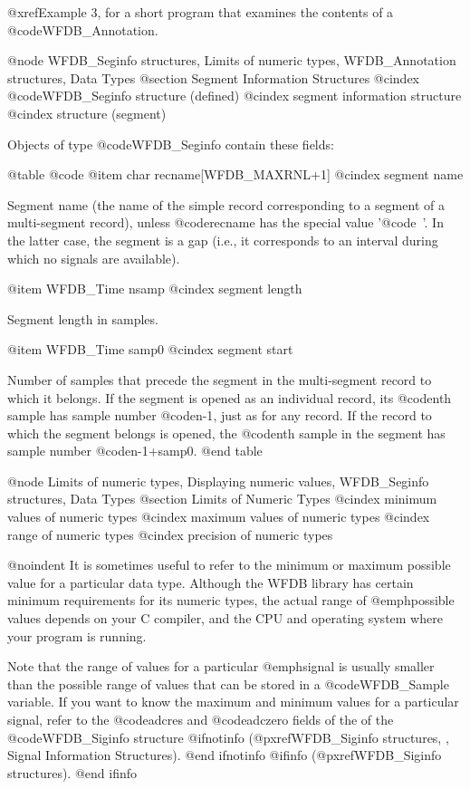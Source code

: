{{{{{{{{{@xref{Example 3}, for a short program that examines the contents of a
@code{WFDB_Annotation}.

@node WFDB_Seginfo structures, Limits of numeric types, WFDB_Annotation structures, Data Types
@section Segment Information Structures
@cindex @code{WFDB_Seginfo} structure (defined)
@cindex segment information structure
@cindex structure (segment)

Objects of type @code{WFDB_Seginfo} contain these fields:

@table @code
@item char recname[WFDB_MAXRNL+1]
@cindex segment name

Segment name (the name of the simple record corresponding
to a segment of a multi-segment record), unless @code{recname}
has the special value '@code{~}'.  In the latter case, the
segment is a gap (i.e., it corresponds to an interval during
which no signals are available).

@item WFDB_Time nsamp
@cindex segment length

Segment length in samples.

@item WFDB_Time samp0
@cindex segment start

Number of samples that precede the segment in the multi-segment record
to which it belongs.  If the segment is opened as an individual
record, its @code{n}th sample has sample number @code{n-1}, just as
for any record.  If the record to which the segment belongs is opened,
the @code{n}th sample in the segment has sample number @code{n-1+samp0}.
@end table

@node Limits of numeric types, Displaying numeric values, WFDB_Seginfo structures, Data Types
@section Limits of Numeric Types
@cindex minimum values of numeric types
@cindex maximum values of numeric types
@cindex range of numeric types
@cindex precision of numeric types

@noindent
It is sometimes useful to refer to the minimum or maximum possible value for a
particular data type.  Although the WFDB library has certain minimum
requirements for its numeric types, the actual range of @emph{possible} values
depends on your C compiler, and the CPU and operating system where your program
is running.

Note that the range of values for a particular @emph{signal} is usually smaller
than the possible range of values that can be stored in a @code{WFDB_Sample}
variable.  If you want to know the maximum and minimum values for a particular
signal, refer to the @code{adcres} and @code{adczero} fields of the of the
@code{WFDB_Siginfo} structure
@ifnotinfo
(@pxref{WFDB_Siginfo structures, , Signal Information Structures}).
@end ifnotinfo
@ifinfo
(@pxref{WFDB_Siginfo structures}).
@end ifinfo

}}}}}}}}}
